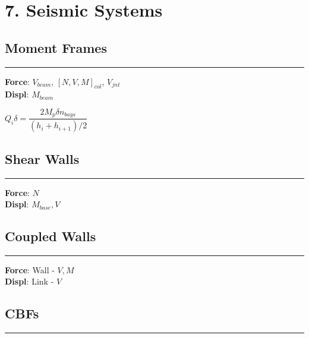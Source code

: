 \hypertarget{seismic-systems}{%
\section{7. Seismic Systems}\label{seismic-systems}}

\hypertarget{moment-frames}{%
\subsection{Moment Frames}\label{moment-frames}}

\begin{center}\rule{0.5\linewidth}{0.5pt}\end{center}

\textbf{Force}: \(V_{beam}\), \([N,V,M]_{col}\), \(V_{jnt}\)\\
\textbf{Displ}: \(M_{beam}\)

\(Q_i \delta = \dfrac{2M_p\delta n_{bays}}{(h_i+h_{i+1})/2}\)

\hypertarget{shear-walls}{%
\subsection{Shear Walls}\label{shear-walls}}

\begin{center}\rule{0.5\linewidth}{0.5pt}\end{center}

\textbf{Force}: \(N\)\\
\textbf{Displ}: \(M_{base},V\)

\hypertarget{coupled-walls}{%
\subsection{Coupled Walls}\label{coupled-walls}}

\begin{center}\rule{0.5\linewidth}{0.5pt}\end{center}

\textbf{Force}: Wall - \(V,M\)\\
\textbf{Displ}: Link - \(V\)

\hypertarget{cbfs}{%
\subsection{CBFs}\label{cbfs}}

\begin{center}\rule{0.5\linewidth}{0.5pt}\end{center}


